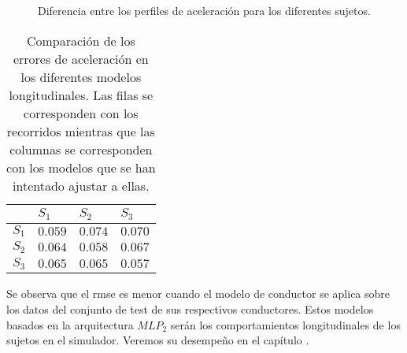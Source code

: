 \begin{figure}[t]
	\centering
	\qquad
	\qquad
	\caption[Diferencia entre los perfiles de aceleración para los diferentes sujetos]{Diferencia entre los perfiles de aceleración para los diferentes sujetos.}
	\label{fig:lm-subjects-comparison}
\end{figure}

\begin{table}
	\centering
	\caption[Comparación de los errores de aceleración en los diferentes modelos longitudinales]{Comparación de los errores de aceleración en los diferentes modelos longitudinales. Las filas se corresponden con los recorridos mientras que las columnas se corresponden con los modelos que se han intentado ajustar a ellas.}
	\label{tbl:lm-subjects-comparison}
	\begin{tabularx}{\linewidth}{YYYY}
		\toprule
		& $S_1$ & $S_2$ & $S_3$ \\
		\midrule
		 $S_1$ & $0.059$        & $0.074$        & $0.070$ \\
		$S_2$ & $0.064$        & $0.058$        & $0.067$ \\
		 $S_3$ & $0.065$        & $0.065$        & $0.057$ \\
		\bottomrule
	\end{tabularx}
\end{table}

Se observa que el \gls{rmse} es menor cuando el modelo de conductor se aplica sobre los datos del conjunto de test de sus respectivos conductores. Estos modelos basados en la arquitectura $MLP_2$ serán los comportamientos longitudinales de los sujetos en el simulador. Veremos su desempeño en el capítulo .